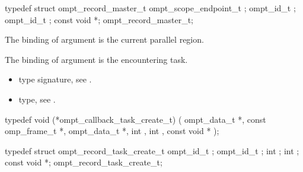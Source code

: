 \record

\begin{ccppspecific}
\begin{omptRecord}
typedef struct ompt_record_master_t {
  ompt_scope_endpoint_t ;
  ompt_id_t ;
  ompt_id_t ;
  const void *;
} ompt_record_master_t;
\end{omptRecord}
\end{ccppspecific}


\argdesc

\epdesc

The binding of argument  is the current parallel region.

The binding of argument  is the encountering task.

\codeptrdesc


\crossreferences
\begin{itemize}
\item {} type signature, see .
\item {} type, see .
\end{itemize}





\label{sec:ompt_callback_task_create_t}
\format

\begin{ccppspecific}
\begin{omptCallback}
typedef void (*ompt_callback_task_create_t) (
  ompt_data_t *,
  const omp_frame_t *,
  ompt_data_t *,
  int ,
  int ,
  const void *
);
\end{omptCallback}
\end{ccppspecific}


\record

\begin{ccppspecific}
\begin{omptRecord}
typedef struct ompt_record_task_create_t {
  ompt_id_t ;
  ompt_id_t ;
  int ;
  int ;
  const void *;
} ompt_record_task_create_t;
\end{omptRecord}
\end{ccppspecific}


